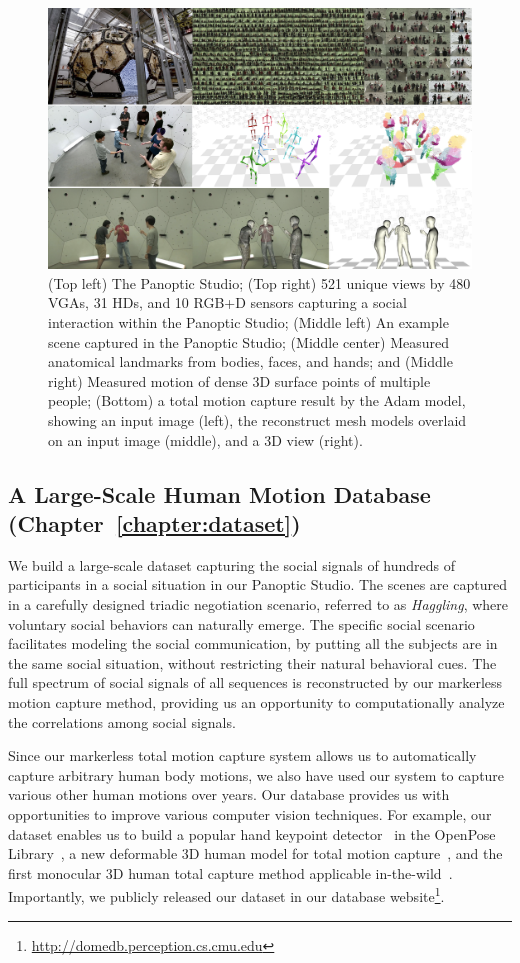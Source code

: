 \begin{figure}[t]
	\centering
	\includegraphics[width=\textwidth]{figures/teaser_4}
	\caption{(Top left) The Panoptic Studio; (Top right) 521 unique views by 480 VGAs, 31 HDs, and 10 RGB+D sensors capturing a social interaction within the Panoptic Studio; (Middle left) An example scene captured in the Panoptic Studio; (Middle center) Measured anatomical landmarks from bodies, faces, and hands; and (Middle right) Measured motion of dense 3D surface points of multiple people; (Bottom) a total motion capture result by the Adam model, showing an input image (left), the reconstruct mesh models overlaid on an input image (middle), and a 3D view (right).}	
	\label{fig:teaser}
\end{figure}

\subsection{A Large-Scale Human Motion Database (Chapter~\ref{chapter:dataset})  }
We build a large-scale dataset capturing the social signals of hundreds of participants in a social situation in our Panoptic Studio. The scenes are captured in a carefully designed triadic negotiation scenario, referred to as \emph{Haggling}, where voluntary social behaviors can naturally emerge. The specific social scenario facilitates modeling the social communication, by putting all the subjects are in the same social situation, without restricting their natural behavioral cues. The full spectrum of social signals of all sequences is reconstructed by our markerless motion capture method, providing us an opportunity to computationally analyze the correlations among social signals.

Since our markerless total motion capture system allows us to automatically capture arbitrary human body motions, we also have used our system to capture various other human motions over years. Our database provides us with opportunities to improve various computer vision techniques. For example, our dataset enables us to build a popular hand keypoint detector~\cite{simon2017hand} in the OpenPose Library~\cite{openpose}, a new deformable 3D human model for total motion capture~\cite{joo2018}, and the first monocular 3D human total capture method applicable in-the-wild~\cite{Xiang2019}. Importantly, we publicly released our dataset in our database website\footnote{\url{http://domedb.perception.cs.cmu.edu}}.

